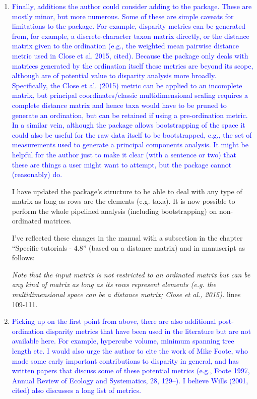 \documentclass[12pt,letterpaper]{article}
\begin{document}
\begin{enumerate}
\item{\textcolor{blue}{Finally, additions the author could consider adding to the package. These are mostly minor, but more numerous. Some of these are simple caveats for limitations to the package. For example, disparity metrics can be generated from, for example, a discrete-character taxon matrix directly, or the distance matrix given to the ordination (e.g., the weighted mean pairwise distance metric used in Close et al. 2015, cited). Because the package only deals with matrices generated by the ordination itself these metrics are beyond its scope, although are of potential value to disparity analysis more broadly. Specifically, the Close et al. (2015) metric can be applied to an incomplete matrix, but principal coordinates/classic multidimensional scaling requires a complete distance matrix and hence taxa would have to be pruned to generate an ordination, but can be retained if using a pre-ordination metric. In a similar vein, although the package allows bootstrapping of the space it could also be useful for the raw data itself to be bootstrapped, e.g., the set of measurements used to generate a principal components analysis. It might be helpful for the author just to make it clear (with a sentence or two) that these are things a user might want to attempt, but the package cannot (reasonably) do.}}



I have updated the package's structure to be able to deal with any type of matrix as long as rows are the elements (e.g. taxa).
It is now possible to perform the whole pipelined analysis (including bootstrapping) on non-ordinated matrices.

I've reflected these changes in the manual with a subsection in the chapter ``Specific tutorials - 4.8'' (based on a distance matrix) and in manuscript as follows:

\textit{Note that the input matrix is not restricted to an ordinated matrix but can be any kind of matrix as long as its rows represent elements (e.g. the multidimensional space can be a distance matrix; Close et al., 2015).} lines 109-111.

\item{\textcolor{blue}{Picking up on the first point from above, there are also additional post-ordination disparity metrics that have been used in the literature but are not available here. For example, hypercube volume, minimum spanning tree length etc. I would also urge the author to cite the work of Mike Foote, who made some early important contributions to disparity in general, and has written papers that discuss some of these potential metrics (e.g., Foote 1997, Annual Review of Ecology and Systematics, 28, 129–). I believe Wills (2001, cited) also discusses a long list of metrics.}}


\end{enumerate}
\end{document}
